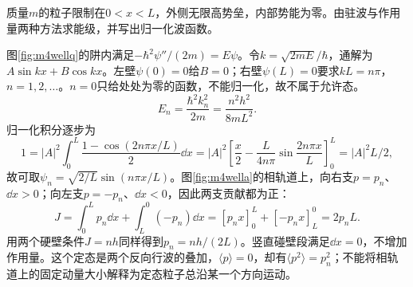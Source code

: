 \begin{example}\label{ex:m4well}
质量$m$的粒子限制在$0<x<L$，外侧无限高势垒，内部势能为零。由驻波与作用量两种方法求能级，并写出归一化波函数。
\end{example}
\begin{solution}
图\ref{fig:m4wellq}的阱内满足$-\hbar^2\psi''/(2m)=E\psi$。令$k=\sqrt{2mE}/\hbar$，通解为$A\sin kx+B\cos kx$。左壁$\psi(0)=0$给$B=0$；右壁$\psi(L)=0$要求$kL=n\pi$，$n=1,2,\ldots$。$n=0$只给处处为零的函数，不能归一化，故不属于允许态。
\[
 E_n=\frac{\hbar^2k_n^2}{2m}=\frac{n^2h^2}{8mL^2}.
\]
归一化积分逐步为
\[
 1=|A|^2\int_0^L\frac{1-\cos(2n\pi x/L)}2\dd x
 =|A|^2\left[\frac x2-\frac{L}{4n\pi}\sin\frac{2n\pi x}{L}\right]_0^L
 =|A|^2L/2,
\]
故可取$\psi_n=\sqrt{2/L}\sin(n\pi x/L)$。图\ref{fig:m4wella}的相轨道上，向右支$p=p_n$、$\dd x>0$；向左支$p=-p_n$、$\dd x<0$，因此两支贡献都为正：
\[
 J=\int_0^L p_n\dd x+\int_L^0(-p_n)\dd x
 =[p_nx]_0^L+[-p_nx]_L^0=2p_nL.
\]
用两个硬壁条件$J=nh$同样得到$p_n=nh/(2L)$。竖直碰壁段满足$\dd x=0$，不增加作用量。这个定态是两个反向行波的叠加，$\langle p\rangle=0$，却有$\langle p^2\rangle=p_n^2$；不能将相轨道上的固定动量大小解释为定态粒子总沿某一个方向运动。
\end{solution}

